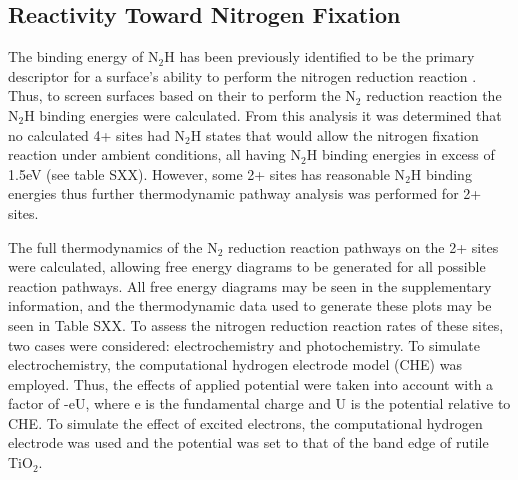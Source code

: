 
\subsection{Reactivity Toward Nitrogen Fixation}

The binding energy of N$_2$H has been previously identified to be the primary descriptor for a surface's ability to perform the nitrogen reduction reaction \cite{Hoskuldsson_2017, Montoya_2015}. Thus, to screen surfaces based on their to perform the N$_2$ reduction reaction the N$_2$H binding energies were calculated. From this analysis it was determined that no calculated 4+ sites had N$_2$H states that would allow the nitrogen fixation reaction under ambient conditions, all having N$_2$H binding energies in excess of 1.5eV (see table SXX). However, some 2+ sites has reasonable N$_2$H binding energies thus further thermodynamic pathway analysis was performed for 2+ sites.

The full thermodynamics of the N$_2$ reduction reaction pathways on the 2+ sites were calculated, allowing free energy diagrams to be generated for all possible reaction pathways. All free energy diagrams may be seen in the supplementary information, and the thermodynamic data used to generate these plots may be seen in Table SXX. To assess the nitrogen reduction reaction rates of these sites, two cases were considered: electrochemistry and photochemistry. To simulate electrochemistry, the computational hydrogen electrode model (CHE) was employed. Thus, the effects of applied potential were taken into account with a factor of -eU, where e is the fundamental charge and U is the potential relative to CHE. To simulate the effect of excited electrons, the computational hydrogen electrode was used and the potential was set to that of the band edge of rutile TiO$_2$. %

